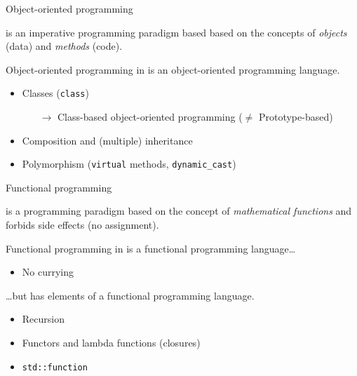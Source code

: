 \begin{frame}{Object-oriented programming}{}
  \begin{definition}
     is an imperative programming paradigm based based on the concepts of \emph{objects} (data) and \emph{methods} (code).
  \end{definition}
  \begin{block}{Object-oriented programming in \CCLang}
    \CCLang is an object-oriented programming language.
    \begin{itemize}
    \item
      Classes (\lstinline!class!)
      \begin{itemize}
      \item[$\to$]
        Class-based object-oriented programming ($\neq$ Prototype-based)
      \end{itemize}
    \item
      Composition and (multiple) inheritance
    \item
      Polymorphism (\lstinline!virtual! methods, \lstinline!dynamic_cast!)
    \end{itemize}
  \end{block}
\end{frame}

\begin{frame}{Functional programming}{}
  \begin{definition}
     is a programming paradigm based on the concept of \emph{mathematical functions} and forbids side effects (no assignment).
  \end{definition}
  \begin{block}{Functional programming in \CCLang}
    \CCLang is  a functional programming language\ldots
    \begin{itemize}
    \item
      No currying
    \end{itemize}
    \ldots but has elements of a functional programming language.
    \begin{itemize}
    \item
      Recursion
    \item
      Functors and lambda functions (closures)
    \item
      \lstinline!std::function!
    \end{itemize}
  \end{block}
\end{frame}

